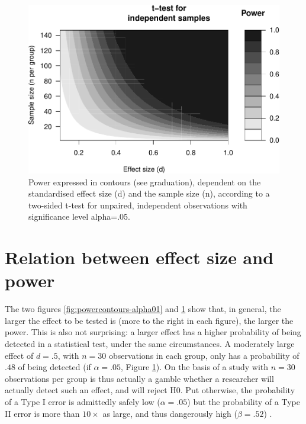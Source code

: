 \documentclass[
]{book}
\begin{document}
\begin{figure}
\centering
\includegraphics{QMS-EN_files/figure-latex/powercontours-alpha05-1.pdf}
\caption{\label{fig:powercontours-alpha05}Power expressed in contours (see graduation), dependent on the standardised effect size (d) and the sample size (n), according to a two-sided t-test for unpaired, independent observations with significance level alpha=.05.}
\end{figure}

\hypertarget{sec:effectsize-power}{%
\section{Relation between effect size and power}\label{sec:effectsize-power}}

The two figures \ref{fig:powercontours-alpha01} and
\ref{fig:powercontours-alpha05} show that, in general, the larger the effect to be
tested is (more to the right in each figure), the larger the power.
This is also not surprising: a larger effect has
a higher probability of being detected in a statistical test, under
the same circumstances. A moderately large effect of
\(d=.5\), with \(n=30\) observations in each group, only has a probability
of \(.48\) of being detected (if \(\alpha=.05\), Figure \ref{fig:powercontours-alpha05}). On the basis
of a study
with \(n=30\) observations per group is thus actually a gamble
whether a researcher will actually detect such an effect, and
will reject H0. Put otherwise, the probability of a Type I error is
admittedly safely low (\(\alpha=.05\)) but the probability of a Type II error is
more than \(10\times\) as large, and thus dangerously high (\(\beta=.52\)) \citep[Ch.12]{Rose08}.
\end{document}
